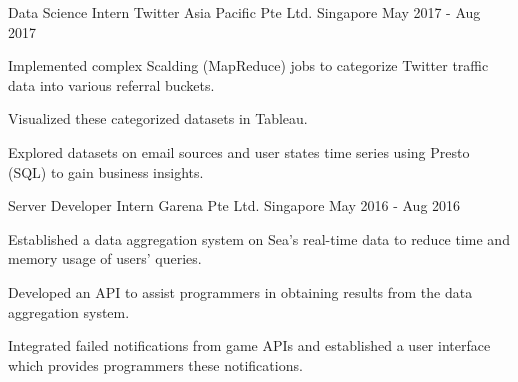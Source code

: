 

\begin{cventries}

  \cventry
  {Data Science Intern} %
  {Twitter Asia Pacific Pte Ltd.} %
  {Singapore} %
  {May 2017 - Aug 2017} %
  {
    \begin{cvitems} %
    \item {Implemented complex Scalding (MapReduce) jobs to categorize Twitter traffic data into various referral buckets.}
    \item {Visualized these categorized datasets in Tableau.}
    \item {Explored datasets on email sources and user states time series using Presto (SQL) to gain business insights.}
    \end{cvitems}
  }

  \cventry
  {Server Developer Intern} %
  {Garena Pte Ltd.} %
  {Singapore} %
  {May 2016 - Aug 2016} %
  {
    \begin{cvitems} %
    \item {Established a data aggregation system on Sea's real-time data to reduce time and memory usage of users' queries.}
    \item {Developed an API to assist programmers in obtaining results from the data aggregation system.}
    \item {Integrated failed notifications from game APIs and established a user interface which provides programmers these notifications.}
    \end{cvitems}
  }

\end{cventries}
